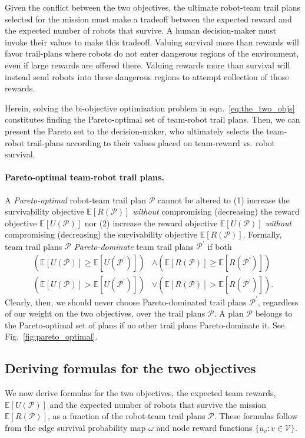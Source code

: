 \documentclass[11pt, oneside]{article}
\begin{document}
Given the conflict between the two objectives, the ultimate robot-team trail plans selected for the mission must make a tradeoff between the expected reward and the expected number of robots that survive. 
A human decision-maker must invoke their values to make this tradeoff.
Valuing survival more than rewards will favor trail-plans where robots do not enter dangerous regions of the environment, even if large rewards are offered there. Valuing rewards more than survival will instead send robots into these dangerous regions to attempt collection of those rewards. 

Herein, solving the bi-objective optimization problem in eqn.~\ref{eq:the_two_objs} constitutes finding the Pareto-optimal set of team-robot trail plans. Then, we can present the Pareto set to the decision-maker, who ultimately selects the team-robot trail-plans according to their values placed on team-reward vs. robot survival. 

\paragraph{Pareto-optimal team-robot trail plans.} 
A \emph{Pareto-optimal} \cite{pardalos2017non} robot-team trail plan $\mathcal{P}$ cannot be altered to
(1) increase the survivability objective $\mathbb{E}[R(\mathcal{P})]$ \emph{without} compromising (decreasing) the reward objective $\mathbb{E}[U(\mathcal{P})]$
nor
(2) increase the reward objective $\mathbb{E}[U(\mathcal{P})]$ \emph{without} compromising (decreasing) the survivability objective $\mathbb{E}[R(\mathcal{P})]$.
Formally, team trail plans $\mathcal{P}$ \emph{Pareto-dominate} team trail plans  $\mathcal{P}^\prime$ if both
\begin{align}
	\left (\mathbb{E}[U(\mathcal{P})] \geq \mathbb{E}[U(\mathcal{P}^\prime)]  \right) & \wedge \left( \mathbb{E}[R(\mathcal{P})] \geq \mathbb{E}[R(\mathcal{P}^\prime)] \right) \\
	\left( \mathbb{E}[U(\mathcal{P})] > \mathbb{E}[U(\mathcal{P}^\prime)] \right) & \vee \left( \mathbb{E}[R(\mathcal{P})] > \mathbb{E}[R(\mathcal{P}^\prime)] \right).
\end{align}
Clearly, then, we should never choose Pareto-dominated trail plans $\mathcal{P}^\prime$, regardless of our weight on the two objectives, over the trail plans $\mathcal{P}$. A plan $\mathcal{P}$ belongs to the Pareto-optimal set of plans if no other trail plans Pareto-dominate it. 
See Fig.~\ref{fig:pareto_optimal}.

\subsection{Deriving formulas for the two objectives}
We now derive formulas for the two objectives, the expected team rewards, $\mathbb{E}[U(\mathcal{P})]$ and the expected number of robots that survive the mission $\mathbb{E}[R(\mathcal{P})]$, as a function of the robot-team trail plans $\mathcal{P}$. These formulas follow from the edge survival probability map $\omega$ and node reward functions $\{u_v : v \in \mathcal{V}\}$.
\end{document}

